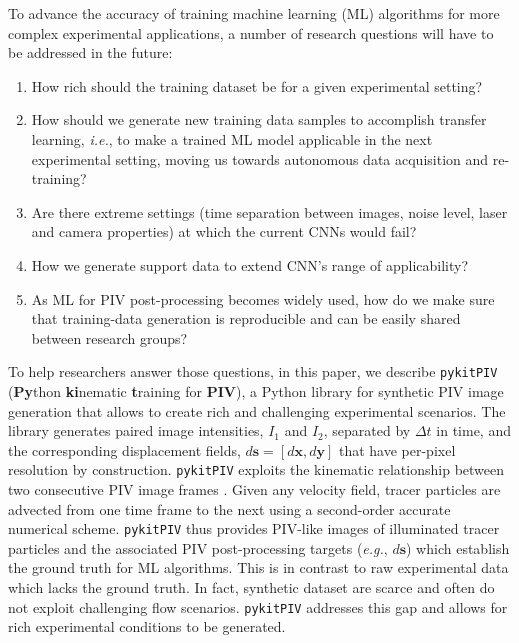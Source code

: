 \documentclass[a4paper,fleqn]{cas-dc}
\begin{document}
To advance the accuracy of training machine learning (ML) algorithms for more complex experimental applications, a number of research questions will have to be addressed in the future:
\begin{enumerate}
\item How rich should the training dataset be for a given experimental setting?
\item How should we generate new training data samples to accomplish transfer learning, \textit{i.e.}, to make a trained ML model applicable in the next experimental setting, moving us towards autonomous data acquisition and re-training?
\item Are there extreme settings (time separation between images, noise level, laser and camera properties) at which the current CNNs would fail?
\item How we generate support data to extend CNN's range of applicability?
\item As ML for PIV post-processing becomes widely used, how do we make sure that training-data generation is reproducible and can be easily shared between research groups?
\end{enumerate}

To help researchers answer those questions, in this paper, we describe \texttt{pykitPIV} (\textbf{Py}thon \textbf{ki}nematic \textbf{t}raining for \textbf{PIV}), a Python library for synthetic PIV image generation that allows to create rich and challenging experimental scenarios. The library generates paired image intensities, $I_1$ and $I_2$, separated by $\Delta t$ in time, and the corresponding displacement fields, $d\mathbf{s} = [d \mathbf{x}, d\mathbf{y}]$ that have per-pixel resolution by construction. \texttt{pykitPIV} exploits the kinematic relationship between two consecutive PIV image frames \cite{manickathan2022kinematic}. Given any velocity field, tracer particles are advected from one time frame to the next using a second-order accurate numerical scheme. \texttt{pykitPIV} thus provides PIV-like images of illuminated tracer particles and the associated PIV post-processing targets (\textit{e.g.}, $d\mathbf{s}$) which establish the ground truth for ML algorithms. This is in contrast to raw experimental data which lacks the ground truth. In fact, synthetic dataset are scarce and often do not exploit challenging flow scenarios. \texttt{pykitPIV} addresses this gap and allows for rich experimental conditions to be generated.
\end{document}
